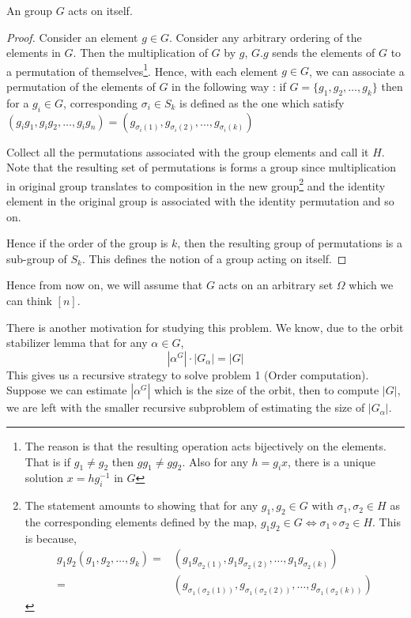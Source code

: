 \begin{claim}
	An group $G$ acts on itself. 
\end{claim}
\begin{proof}
Consider an element $g \in G$. Consider any arbitrary ordering of the elements
in $G$. Then the multiplication of $G$ by $g$, $G.g$ sends
the elements of $G$ to a permutation of themselves\footnote{The reason is that
	the resulting
operation acts bijectively on the elements. That is if $g_1 \ne g_2$ then
$gg_1 \ne gg_2$. Also for any $h = g_ix$, there is a unique solution $x =
hg_i^{-1}$ in $G$}. Hence, with each element
$g \in G$, we can associate a permutation of the elements of $G$ in the
following way : if $G = \{g_1,g_2,\ldots,g_k\}$ then for a $g_i \in G$,
corresponding $\sigma_i \in S_k$ is defined as the one which satisfy
$(g_ig_1,g_ig_2,\ldots,g_ig_n) = (g_{\sigma_i(1)}, g_{\sigma_i(2)}, \ldots, 
g_{\sigma_i(k)})$

Collect all the permutations associated with the group elements and call it
$H$. Note that the resulting set of permutations is forms a group since
multiplication in original group translates to composition in the new
group\footnote{ The statement amounts to showing that for 
	any $g_1,g_2 \in G$ with $\sigma_1, \sigma_2 \in H$ as
	the corresponding elements defined by the map, 
	$g_1g_2 \in G \iff \sigma_1 \circ \sigma_2 \in H$. This is because, 
	\begin{align*}
		g_1g_2 (g_1, g_2, \ldots, g_k) 
		= & (g_1 g_{\sigma_2(1)}, g_1 g_{\sigma_2(2)}, \ldots, 
		g_1 g_{\sigma_2(k)}) \\
		= & (g_{\sigma_1(\sigma_2(1))}, g_{\sigma_1(\sigma_2(2))},
		\ldots, g_{\sigma_1(\sigma_2(k))})
	\end{align*}
}
and the identity element in the original group is associated with the identity
permutation and so on.

Hence if the order of the group is $k$, then the resulting group of
permutations is a sub-group of $S_{k}$. This defines the notion of a group
acting on itself.
\end{proof}
\begin{note}
Hence from now on, we will assume that $G$ acts on an arbitrary set $\Omega$
which we can think $[n]$.
\end{note}

There is another motivation for studying this problem. We know, due to the 
orbit stabilizer lemma that for any $\alpha \in  G$, $$|\alpha^{G}|\cdot
|G_{\alpha}| = |G|$$ This gives us a recursive strategy to solve problem 1
(Order computation). Suppose we can estimate $|\alpha^{G}|$ which is the size
of the orbit, then to compute $|G|$, we are left with the smaller recursive
subproblem of estimating the size of $|G_{\alpha}|$. 

